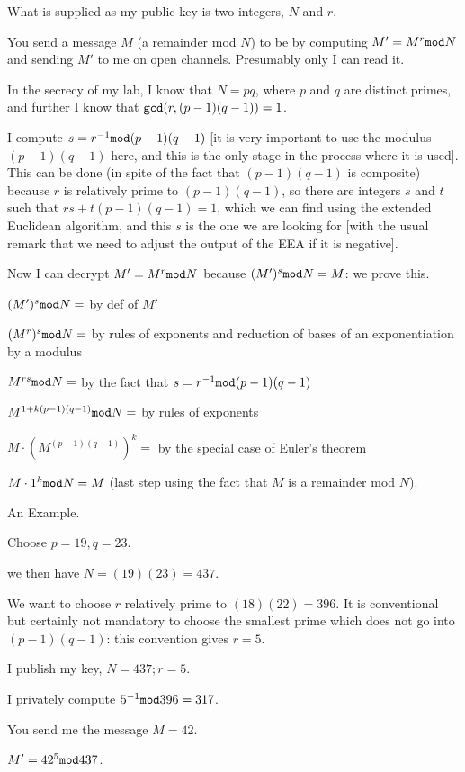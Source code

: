 \documentclass[12pt]{article}
\begin{document}
What is supplied as my public key is two integers, $N$ and $r$.

You send a message $M$ (a remainder mod $N$) to be by computing $M' = M^r {\tt mod} N$ and sending $M'$ to me on open channels.  Presumably only I can read it.

In the secrecy of my lab, I know that $N=pq$, where $p$ and $q$ are distinct primes, and further I know that
${\tt gcd}(r,(p-1)(q-1)) = 1$.

I compute $s = r^{-1} {\tt mod} (p-1)(q-1)$ [it is very important to use the modulus $(p-1)(q-1)$ here, and this is the only stage in the process where it is used].   This can be done (in spite of the fact that $(p-1)(q-1)$ is composite) because $r$ is relatively prime to $(p-1)(q-1)$, so there are integers $s$ and $t$ such that $rs + t(p-1)(q-1) = 1$,
which we can find using the extended Euclidean algorithm,  and this $s$ is the one we are looking for [with the usual remark that we need to adjust the output of the EEA if it is negative].

Now I can decrypt $M' = M^r {\tt mod} N$ because $(M')^s {\tt mod} N = M$:  we prove this.

$(M')^s {\tt mod} N =$  by def of $M'$

$(M^r)^s {\tt mod} N =$ by rules of exponents and reduction of bases of an exponentiation by a modulus

$M^{rs} {\tt mod} N =$ by the fact that $s=r^{-1}{\tt mod}(p-1)(q-1)$

$M^{1+k(p-1)(q-1)} {\tt mod}N= $  by rules of exponents 

$M \cdot (M^{(p-1)(q-1)})^k =$ by the special case of Euler's theorem

$M\cdot 1^k {\tt mod}N = M$ (last step using the fact that $M$ is a remainder mod $N$).

An Example.

Choose $p=19, q=23$.

we then have $N=(19)(23) = 437$.

We want to choose $r$ relatively prime to $(18)(22) = 396$.  It is conventional but certainly not mandatory
to choose the smallest prime which does not go into $(p-1)(q-1)$:  this convention gives $r=5$.

I publish my key, $N=437; r=5$.

I privately compute $5^{-1}{\tt mod}396 = 317$.

You send me the message $M=42$.

$M' = 42^5 {\tt mod} 437$.
\end{document}
